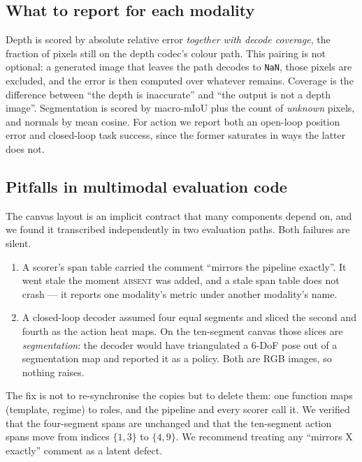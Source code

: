\documentclass{article}
\begin{document}
\subsection{What to report for each modality}

Depth is scored by absolute relative error \emph{together with decode coverage}, the fraction of
pixels still on the depth codec's colour path. This pairing is not optional: a generated image
that leaves the path decodes to \texttt{NaN}, those pixels are excluded, and the error is then
computed over whatever remains. Coverage is the difference between ``the depth is inaccurate'' and
``the output is not a depth image''. Segmentation is scored by macro-mIoU plus the count of
\emph{unknown} pixels, and normals by mean cosine. For action we report both an open-loop
position error and closed-loop task success, since the former saturates in ways the latter does
not.

\subsection{Pitfalls in multimodal evaluation code}
\label{sec:pitfalls}

The canvas layout is an implicit contract that many components depend on, and we found it
transcribed independently in two evaluation paths. Both failures are silent.

\begin{enumerate}
\item A scorer's span table carried the comment ``mirrors the pipeline exactly''. It went stale
      the moment \textsc{absent} was added, and a stale span table does not crash --- it reports
      one modality's metric under another modality's name.
\item A closed-loop decoder assumed four equal segments and sliced the second and fourth as the
      action heat maps. On the ten-segment canvas those slices are \emph{segmentation}: the
      decoder would have triangulated a 6-DoF pose out of a segmentation map and reported it as a
      policy. Both are RGB images, so nothing raises.
\end{enumerate}
The fix is not to re-synchronise the copies but to delete them: one function maps
(template, regime) to roles, and the pipeline and every scorer call it. We verified that the
four-segment spans are unchanged and that the ten-segment action spans move from indices
$\{1,3\}$ to $\{4,9\}$. We recommend treating any ``mirrors X exactly'' comment as a latent
defect.
\end{document}

